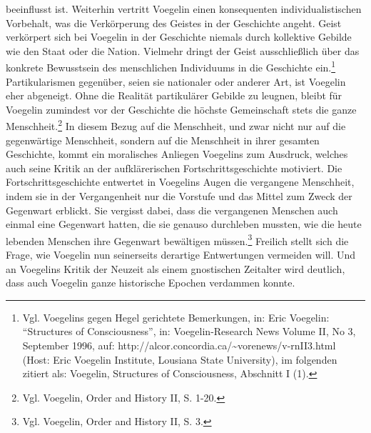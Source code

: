 beeinflusst ist. Weiterhin vertritt Voegelin einen konsequenten
individualistischen Vorbehalt, was die Verkörperung des Geistes in der
Geschichte angeht. Geist verkörpert sich bei Voegelin in der Geschichte
niemals durch kollektive Gebilde wie den Staat oder die Nation. Vielmehr
dringt der Geist ausschließlich über das konkrete Bewusstsein des menschlichen
Individuums in die Geschichte ein.\footnote{Vgl.  Voegelins gegen Hegel
  gerichtete Bemerkungen, in: Eric Voegelin: "`Structures of Consciousness"',
  in: Voegelin-Research News Volume II, No 3, September 1996, auf:
  http://alcor.concordia.ca/\~{ }vorenews/v-rnII3.html (Host: Eric Voegelin
  Institute, Lousiana State University), im folgenden zitiert als: Voegelin,
  Structures of Consciousness, Abschnitt I (1).}  Partikularismen gegenüber,
seien sie nationaler oder anderer Art, ist Voegelin eher abgeneigt.  Ohne die
Realität partikulärer Gebilde zu leugnen, bleibt für Voegelin zumindest vor
der Geschichte die höchste Gemeinschaft stets die ganze
Menschheit.\footnote{Vgl. Voegelin, Order and History II, S. 1-20.} In diesem
Bezug auf die Menschheit, und zwar nicht nur auf die gegenwärtige Menschheit,
sondern auf die Menschheit in ihrer gesamten Geschichte, kommt ein moralisches
Anliegen Voegelins zum Ausdruck, welches auch seine Kritik an der
aufklärerischen Fortschrittsgeschichte motiviert. Die Fortschrittsgeschichte
entwertet in Voegelins Augen die vergangene Menschheit, indem sie in der
Vergangenheit nur die Vorstufe und das Mittel zum Zweck der Gegenwart
erblickt. Sie vergisst dabei, dass die vergangenen Menschen auch einmal eine
Gegenwart hatten, die sie genauso durchleben mussten, wie die heute lebenden
Menschen ihre Gegenwart bewältigen müssen.\footnote{Vgl. Voegelin, Order and
  History II, S. 3.}  Freilich stellt sich die Frage, wie Voegelin nun
seinerseits derartige Entwertungen vermeiden will. Und an Voegelins Kritik der
Neuzeit als einem gnostischen Zeitalter wird deutlich, dass auch Voegelin
ganze historische Epochen verdammen konnte.

